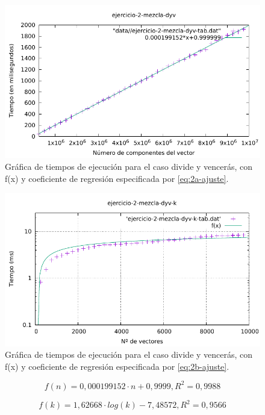 \begin{figure}[h]
    \centering
    \includegraphics[scale=0.76]{img/e2-dyv-n.pdf}
    \caption{Gráfica de tiempos de ejecución para el caso divide y vencerás, 
    con f(x) y coeficiente de regresión especificada por \ref{eq:2a-ajuste}.}
    \label{fig:2a-obvio-n-graph}
\end{figure}


\begin{figure}[h]
    \centering
    \includegraphics[scale=0.76]{img/e2-dyv-k.pdf}
    \caption{Gráfica de tiempos de ejecución para el caso divide y vencerás, 
    con f(x) y coeficiente de regresión especificada por \ref{eq:2b-ajuste}.}
    \label{fig:2b-dyv-k-graph}
\end{figure}

\begin{equation}
    \boxed{f(n) = 0,000199152 \cdot n + 0,9999, R^2 = 0,9988}
    \label{eq:2b-ajuste-n}
\end{equation}

\begin{equation}
\boxed{f(k) = 1,62668 \cdot log(k) - 7,48572 , R^2 = 0,9566}
\label{eq:2a-ajuste-k}
\end{equation}


